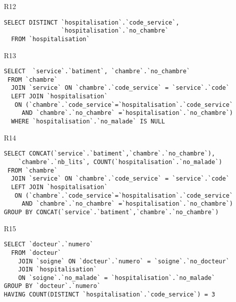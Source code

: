 \begin{enumerate}
  \item[R12]
\begin{verbatim}
SELECT DISTINCT `hospitalisation`.`code_service`, 
                `hospitalisation`.`no_chambre`
  FROM `hospitalisation`
\end{verbatim}

  \item[R13]
\begin{verbatim}
SELECT  `service`.`batiment`, `chambre`.`no_chambre`
 FROM `chambre` 
  JOIN `service` ON `chambre`.`code_service` = `service`.`code`
  LEFT JOIN `hospitalisation`
   ON (`chambre`.`code_service`=`hospitalisation`.`code_service`
     AND `chambre`.`no_chambre` =`hospitalisation`.`no_chambre`)
  WHERE `hospitalisation`.`no_malade` IS NULL
\end{verbatim}

  \item[R14]
\begin{verbatim}
SELECT CONCAT(`service`.`batiment`,`chambre`.`no_chambre`),
    `chambre`.`nb_lits`, COUNT(`hospitalisation`.`no_malade`)
 FROM `chambre` 
  JOIN `service` ON `chambre`.`code_service` = `service`.`code`
  LEFT JOIN `hospitalisation` 
   ON (`chambre`.`code_service`=`hospitalisation`.`code_service` 
     AND `chambre`.`no_chambre` =`hospitalisation`.`no_chambre`)
GROUP BY CONCAT(`service`.`batiment`,`chambre`.`no_chambre`)
\end{verbatim}

  \item[R15]
\begin{verbatim}
SELECT `docteur`.`numero`
  FROM `docteur`
    JOIN `soigne` ON `docteur`.`numero` = `soigne`.`no_docteur`
    JOIN `hospitalisation` 
    ON `soigne`.`no_malade` = `hospitalisation`.`no_malade`
GROUP BY `docteur`.`numero`
HAVING COUNT(DISTINCT `hospitalisation`.`code_service`) = 3
\end{verbatim}


\end{enumerate}
